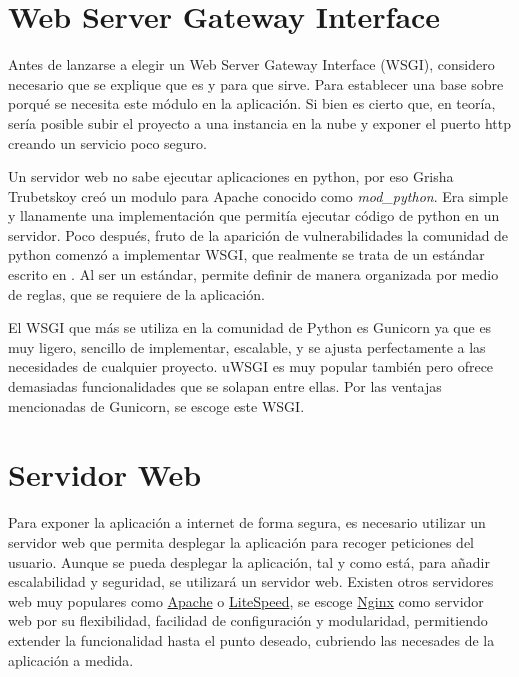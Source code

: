 \section{Web Server Gateway Interface}
Antes de lanzarse a elegir un Web Server Gateway Interface (WSGI), considero necesario que se explique que es y para que sirve. Para establecer una base sobre porqué se necesita este módulo en la aplicación. Si bien es cierto que, en teoría, sería posible subir el proyecto a una instancia en la nube y exponer el puerto \gls{http} creando un servicio poco seguro.

Un servidor web no sabe ejecutar aplicaciones en python, por eso Grisha Trubetskoy creó un modulo para Apache conocido como \textit{mod\_python}. Era simple y llanamente una implementación que permitía ejecutar código de python en un servidor. Poco después, fruto de la aparición de vulnerabilidades la comunidad de python comenzó a implementar WSGI, que realmente se trata de un estándar escrito en . Al ser un estándar, permite definir de manera organizada por medio de reglas, que se requiere de la aplicación. 

El WSGI que más se utiliza en la comunidad de Python es Gunicorn ya que es muy ligero, sencillo de implementar, escalable, y se ajusta perfectamente a las necesidades de cualquier proyecto. uWSGI es muy popular también pero ofrece demasiadas funcionalidades que se solapan entre ellas. Por las ventajas mencionadas de Gunicorn, se escoge este WSGI.

\section{Servidor Web}
Para exponer la aplicación a internet de forma segura, es necesario utilizar un servidor web que permita desplegar la aplicación para recoger peticiones del usuario. Aunque se pueda desplegar la aplicación, tal y como está, para añadir escalabilidad y seguridad, se utilizará un servidor web. Existen otros servidores web muy populares como \href{https://httpd.apache.org/}{Apache} o \href{https://www.litespeedtech.com/products/litespeed-web-server}{LiteSpeed}, se escoge \href{https://nginx.org/en/}{Nginx} como servidor web por su flexibilidad, facilidad de configuración y modularidad, permitiendo extender la funcionalidad hasta el punto deseado, cubriendo las necesades de la aplicación a medida.
